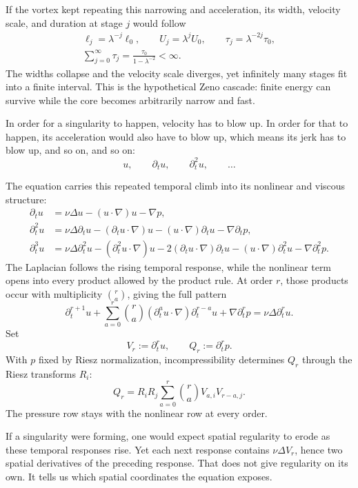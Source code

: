 If the vortex kept repeating this narrowing and acceleration, its width,
velocity scale, and duration at stage \(j\) would follow
\[
\begin{gathered}
 \ell_j=\lambda^{-j}\ell_0,
 \qquad
 U_j=\lambda^jU_0,
 \qquad
 \tau_j=\lambda^{-2j}\tau_0,
 \\
 \sum_{j=0}^{\infty}\tau_j
 =\frac{\tau_0}{1-\lambda^{-2}}<\infty.
\end{gathered}
\]
The widths collapse and the velocity scale diverges, yet infinitely many
stages fit into a finite interval.  This is the hypothetical Zeno cascade:
finite energy can survive while the core becomes arbitrarily narrow and fast.

In order for a singularity to happen, velocity
has to blow up.  In order for that to happen, its acceleration would also have
to blow up, which means its jerk has to blow up, and so on, and so on:
\[
 u,\qquad \partial_tu,\qquad \partial_t^2u,\qquad\ldots
\]

The equation carries this repeated temporal climb into its nonlinear and
viscous structure:
\[
\begin{aligned}
 \partial_tu
 &=\nu\Delta u-(u\!\cdot\nabla)u-\nabla p,\\
 \partial_t^2u
 &=\nu\Delta\partial_tu
   -(\partial_tu\!\cdot\nabla)u
   -(u\!\cdot\nabla)\partial_tu
   -\nabla\partial_tp,\\
 \partial_t^3u
 &=\nu\Delta\partial_t^2u
   -(\partial_t^2u\!\cdot\nabla)u
   -2(\partial_tu\!\cdot\nabla)\partial_tu
   -(u\!\cdot\nabla)\partial_t^2u
   -\nabla\partial_t^2p.
\end{aligned}
\]
The Laplacian follows the rising temporal response, while the nonlinear term
opens into every product allowed by the product rule.  At order \(r\), those
products occur with multiplicity \(\binom ra\), giving the full pattern
\[
 \partial_t^{r+1}u
 +\sum_{a=0}^{r}\binom ra
   (\partial_t^au\!\cdot\nabla)\partial_t^{r-a}u
   +\nabla\partial_t^rp
   =\nu\Delta\partial_t^ru.
\]
Set
\[
 V_r:=\partial_t^ru,
 \qquad
 Q_r:=\partial_t^rp.
\]
With \(p\) fixed by Riesz normalization, incompressibility determines \(Q_r\)
through the Riesz transforms \(R_i\):
\[
 Q_r
 =R_iR_j\sum_{a=0}^{r}\binom ra
   V_{a,i}V_{r-a,j}.
\]
The pressure row stays with the nonlinear row at every order.

If a singularity were forming, one would expect spatial regularity to erode as
these temporal responses rise.  Yet each next response contains
\(\nu\Delta V_r\), hence two spatial derivatives of the preceding response.
That does not give regularity on its own.  It tells us which spatial
coordinates the equation exposes.

